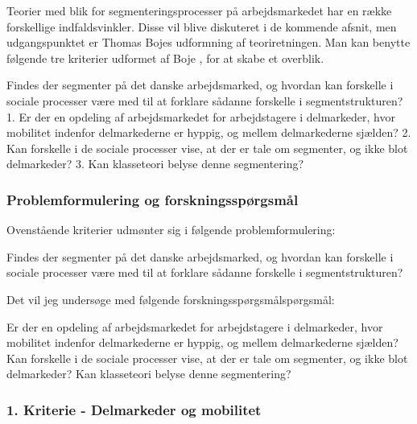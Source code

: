 Teorier med blik for segmenteringsprocesser på arbejdsmarkedet har en række forskellige indfaldsvinkler. Disse vil blive diskuteret i de kommende afsnit, men udgangspunktet er Thomas Bojes udformning af teoriretningen. Man kan benytte følgende tre kriterier udformet af Boje \parencite[174]{Boje1986}, for at skabe et overblik.


Findes der segmenter på det danske arbejdsmarked, og hvordan kan forskelle i sociale processer være med til at forklare sådanne forskelle i segmentstrukturen?
1. Er der en opdeling af arbejdsmarkedet for arbejdstagere i delmarkeder, hvor mobilitet indenfor delmarkederne er hyppig, og mellem delmarkederne sjælden?
2. Kan forskelle i de sociale processer vise, at der er tale om segmenter, og ikke blot delmarkeder?
3. Kan klasseteori belyse denne segmentering?

\subsubsection{Problemformulering og forskningsspørgsmål}
%
Ovenstående kriterier udmønter sig i følgende problemformulering:
%
\vspace{\baselineskip}
%
\begin{tcolorbox}[title=\textbf{Problemformulering}]
Findes der segmenter på det danske arbejdsmarked, og hvordan kan forskelle i sociale processer være med til at forklare sådanne forskelle i segmentstrukturen?
\end{tcolorbox}
%
\vspace{\baselineskip}
Det vil jeg undersøge med følgende forskningsspørgsmålspørgsmål:
\vspace{\baselineskip}
\begin{tcolorbox}[title=Forskningspørgsmål,
subtitle style={boxrule=0.4pt} ]
Er der en opdeling af arbejdsmarkedet for arbejdstagere i delmarkeder, hvor mobilitet indenfor delmarkederne er hyppig, og mellem delmarkederne sjælden?
Kan forskelle i de sociale processer vise, at der er tale om segmenter, og ikke blot delmarkeder?
Kan klasseteori belyse denne segmentering?
\end{tcolorbox}


\subsubsection{1. Kriterie - Delmarkeder og mobilitet}

